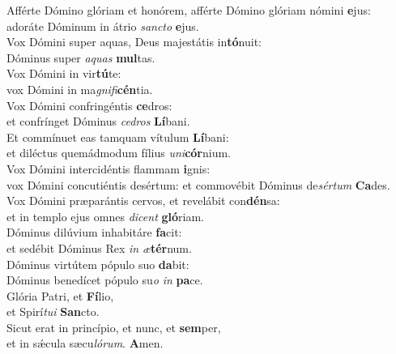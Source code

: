 \evenverse Afférte Dómino glóriam et honórem, afférte Dómino glóriam nómini \textbf{e}jus:~\*\\
\evenverse adoráte Dóminum in átrio \textit{san}\textit{cto} \textbf{e}jus.\\
\oddverse Vox Dómini super aquas, Deus majestátis in\textbf{tó}nuit:~\*\\
\oddverse Dóminus super \textit{a}\textit{quas} \textbf{mul}tas.\\
\evenverse Vox Dómini in vir\textbf{tú}te:~\*\\
\evenverse vox Dómini in ma\textit{gni}\textit{fi}\textbf{cén}tia.\\
\oddverse Vox Dómini confringéntis \textbf{ce}dros:~\*\\
\oddverse et confrínget Dóminus \textit{ce}\textit{dros} \textbf{Lí}bani.\\
\evenverse Et commínuet eas tamquam vítulum \textbf{Lí}bani:~\*\\
\evenverse et diléctus quemádmodum fílius \textit{u}\textit{ni}\textbf{cór}nium.\\
\oddverse Vox Dómini intercidéntis flammam \textbf{i}gnis:~\*\\
\oddverse vox Dómini concutiéntis desértum: et commovébit Dóminus de\textit{sér}\textit{tum} \textbf{Ca}des.\\
\evenverse Vox Dómini præparántis cervos, et revelábit con\textbf{dén}sa:~\*\\
\evenverse et in templo ejus omnes \textit{di}\textit{cent} \textbf{gló}riam.\\
\oddverse Dóminus dilúvium inhabitáre \textbf{fa}cit:~\*\\
\oddverse et sedébit Dóminus Rex \textit{in} \textit{æ}\textbf{tér}num.\\
\evenverse Dóminus virtútem pópulo suo \textbf{da}bit:~\*\\
\evenverse Dóminus benedícet pópulo su\textit{o} \textit{in} \textbf{pa}ce.\\
\oddverse Glória Patri, et \textbf{Fí}lio,~\*\\
\oddverse et Spirí\textit{tu}\textit{i} \textbf{San}cto.\\
\evenverse Sicut erat in princípio, et nunc, et \textbf{sem}per,~\*\\
\evenverse et in sǽcula sæcu\textit{ló}\textit{rum}. \textbf{A}men.\\
